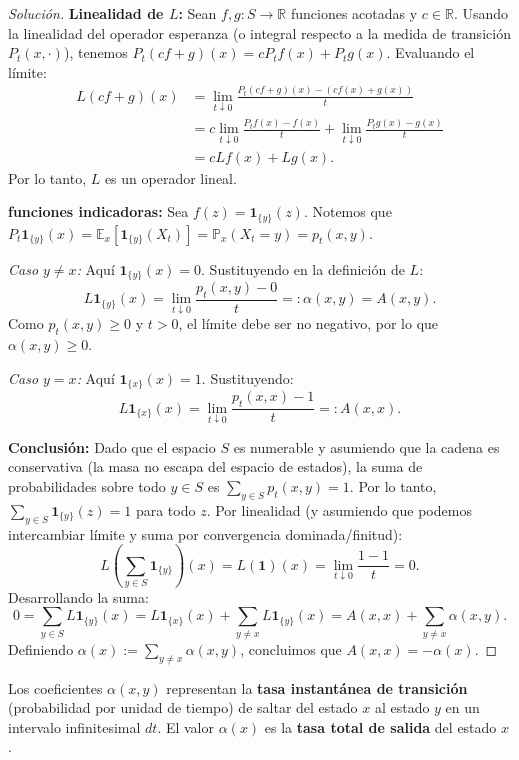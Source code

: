 \documentclass[10pt,a4paper]{article}
\begin{document}
\begin{proof}[Solución]
    \textbf{Linealidad de $L$:}
    Sean $f, g: S \to \mathbb{R}$ funciones acotadas y $c \in \mathbb{R}$. Usando la linealidad del operador esperanza (o integral respecto a la medida de transición $P_t(x, \cdot)$), tenemos $P_t(cf + g)(x) = cP_tf(x) + P_tg(x)$. Evaluando el límite:
    \begin{align*}
        L(cf + g)(x) &= \lim_{t \downarrow 0} \frac{P_t(cf + g)(x) - (cf(x) + g(x))}{t} \\
        &= c \lim_{t \downarrow 0} \frac{P_tf(x) - f(x)}{t} + \lim_{t \downarrow 0} \frac{P_tg(x) - g(x)}{t} \\
        &= cLf(x) + Lg(x).
    \end{align*}
    Por lo tanto, $L$ es un operador lineal.

    \textbf{funciones indicadoras:}
    Sea $f(z) = \mathbf{1}_{\{y\}}(z)$. Notemos que $P_t \mathbf{1}_{\{y\}}(x) = \mathbb{E}_x[\mathbf{1}_{\{y\}}(X_t)] = \mathbb{P}_x(X_t = y) = p_t(x,y)$.

    \textit{Caso $y \neq x$:} Aquí $\mathbf{1}_{\{y\}}(x) = 0$. Sustituyendo en la definición de $L$:
    \[ L\mathbf{1}_{\{y\}}(x) = \lim_{t \downarrow 0} \frac{p_t(x,y) - 0}{t} =: \alpha(x,y) = A(x,y). \]
    Como $p_t(x,y) \ge 0$ y $t > 0$, el límite debe ser no negativo, por lo que $\alpha(x,y) \ge 0$.

    \textit{Caso $y = x$:} Aquí $\mathbf{1}_{\{x\}}(x) = 1$. Sustituyendo:
    \[ L\mathbf{1}_{\{x\}}(x) = \lim_{t \downarrow 0} \frac{p_t(x,x) - 1}{t} =: A(x,x). \]

    \textbf{Conclusión:}
    Dado que el espacio $S$ es numerable y asumiendo que la cadena es conservativa (la masa no escapa del espacio de estados), la suma de probabilidades sobre todo $y \in S$ es $\sum_{y \in S} p_t(x,y) = 1$.
    Por lo tanto, $\sum_{y \in S} \mathbf{1}_{\{y\}}(z) = 1$ para todo $z$. Por linealidad (y asumiendo que podemos intercambiar límite y suma por convergencia dominada/finitud):
    \[ L\left( \sum_{y \in S} \mathbf{1}_{\{y\}} \right)(x) = L(\mathbf{1})(x) = \lim_{t \downarrow 0} \frac{1 - 1}{t} = 0. \]
    Desarrollando la suma:
    \[ 0 = \sum_{y \in S} L\mathbf{1}_{\{y\}}(x) = L\mathbf{1}_{\{x\}}(x) + \sum_{y \neq x} L\mathbf{1}_{\{y\}}(x) = A(x,x) + \sum_{y \neq x} \alpha(x,y). \]
    Definiendo $\alpha(x) := \sum_{y \neq x} \alpha(x,y)$, concluimos que $A(x,x) = -\alpha(x)$.
\end{proof}

\begin{nota}{}
    Los coeficientes $\alpha(x,y)$ representan la \textbf{tasa instantánea de transición} (probabilidad por unidad de tiempo) de saltar del estado $x$ al estado $y$ en un intervalo infinitesimal $dt$. El valor $\alpha(x)$ es la \textbf{tasa total de salida} del estado $x$.
\end{nota}
\end{document}
